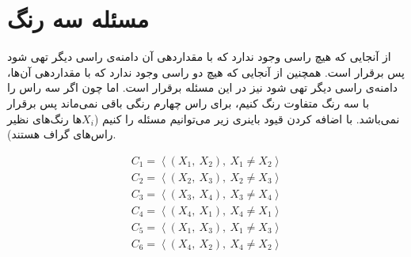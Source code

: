 \documentclass{article}
\begin{document}
\section{مسئله سه رنگ}
از آنجایی که هیچ راسی وجود ندارد که با مقداردهی آن دامنه‌ی راسی دیگر تهی شود پس   برقرار است. همچنین از آنجایی که هیچ دو راسی وجود ندارد که با مقداردهی آن‌ها، دامنه‌ی راسی دیگر تهی شود  نیز در این مسئله برقرار است. اما چون اگر سه راس را با سه رنگ متفاوت رنگ کنیم، برای راس چهارم رنگی باقی نمی‌ماند پس  برقرار نمی‌باشد. با اضافه کردن قیود باینری زیر می‌توانیم مسئله را  کنیم ($X_{i}$ها رنگ‌های نظیر راس‌های گراف هستند). \\
\begin{fleqn}
\begin{equation}
\begin{aligned}
C_{1} = \left\langle \left( X_{1},\: X_{2} \right),\: X_{1} \neq X_{2} \right\rangle \\
C_{2} = \left\langle \left( X_{2},\: X_{3} \right),\: X_{2} \neq X_{3} \right\rangle \\
C_{3} = \left\langle \left( X_{3},\: X_{4} \right),\: X_{3} \neq X_{4} \right\rangle \\
C_{4} = \left\langle \left( X_{4},\: X_{1} \right),\: X_{4} \neq X_{1} \right\rangle \\
C_{5} = \left\langle \left( X_{1},\: X_{3} \right),\: X_{1} \neq X_{3} \right\rangle \\
C_{6} = \left\langle \left( X_{4},\: X_{2} \right),\: X_{4} \neq X_{2} \right\rangle
\end{aligned}
\end{equation}
\end{fleqn}



\section{}
\end{document}
